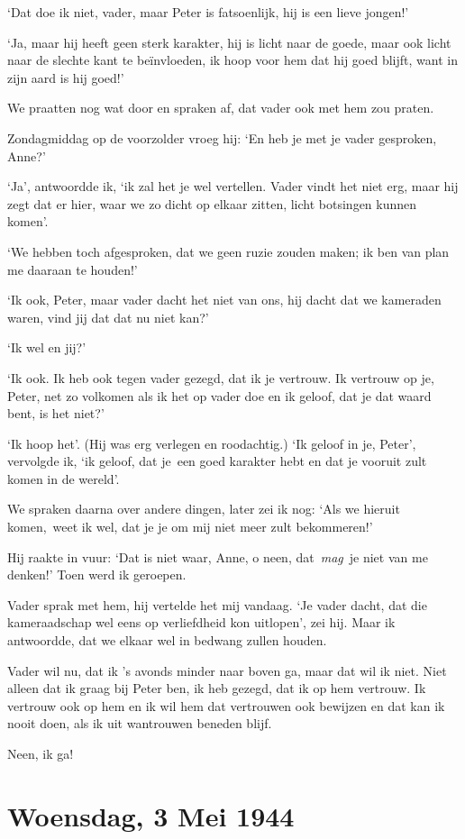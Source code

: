\documentclass{book}
\begin{document}
`Dat doe ik niet, vader, maar Peter is fatsoenlijk, hij is een lieve
jongen!'

`Ja, maar hij heeft geen sterk karakter, hij is licht naar de goede,
maar ook licht naar de slechte kant te beïnvloeden, ik hoop voor hem dat
hij goed blijft, want in zijn aard is hij goed!'

We praatten nog wat door en spraken af, dat vader ook met hem zou
praten.

Zondagmiddag op de voorzolder vroeg hij: `En heb je met je vader
gesproken, Anne?'

`Ja', antwoordde ik, `ik zal het je wel vertellen. Vader vindt het niet
erg, maar hij zegt dat er hier, waar we zo dicht op elkaar zitten, licht
botsingen kunnen komen'.

`We hebben toch afgesproken, dat we geen ruzie zouden maken; ik ben van
plan me daaraan te houden!'

`Ik ook, Peter, maar vader dacht het niet van ons, hij dacht dat we
kameraden waren, vind jij dat dat nu niet kan?'

`Ik wel en jij?'

`Ik ook. Ik heb ook tegen vader gezegd, dat ik je vertrouw. Ik vertrouw
op je, Peter, net zo volkomen als ik het op vader doe en ik geloof, dat
je dat waard bent, is het niet?'

`Ik hoop het'. (Hij was erg verlegen en roodachtig.) `Ik geloof in je,
Peter', vervolgde ik, `ik geloof, dat je~een goed karakter hebt en dat
je vooruit zult komen in de wereld'.

We spraken daarna over andere dingen, later zei ik nog: `Als we hieruit
komen,~weet ik wel, dat je je om mij niet meer zult bekommeren!'

Hij raakte in vuur: `Dat is niet waar, Anne, o neen, dat~\emph{mag}~je
niet van me denken!' Toen werd ik geroepen.

Vader sprak met hem, hij vertelde het mij vandaag. `Je vader dacht, dat
die kameraadschap wel eens op verliefdheid kon uitlopen', zei hij. Maar
ik antwoordde, dat we elkaar wel in bedwang zullen houden.

Vader wil nu, dat ik 's avonds minder naar boven ga, maar dat wil ik
niet. Niet alleen dat ik graag bij Peter ben, ik heb gezegd, dat ik op
hem vertrouw. Ik vertrouw ook op hem en ik wil hem dat vertrouwen ook
bewijzen en dat kan ik nooit doen, als ik uit wantrouwen beneden blijf.

Neen, ik ga!

\chapter{Woensdag, 3 Mei 1944}
\end{document}
